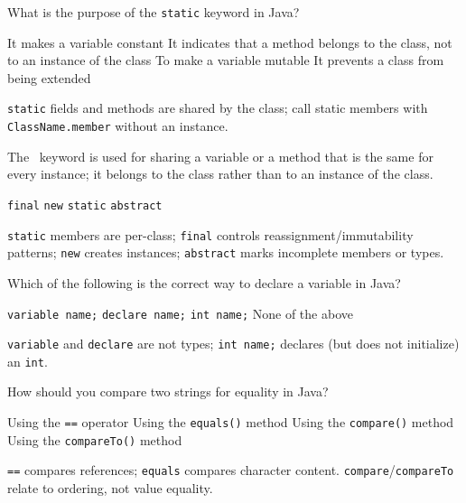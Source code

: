 \question[4]
What is the purpose of the \texttt{static} keyword in Java?
\begin{choices}
  \choice It makes a variable constant
  \CorrectChoice It indicates that a method belongs to the class, not to an instance of the class
  \choice To make a variable mutable
  \choice It prevents a class from being extended
\end{choices}
\begin{solution}
  \texttt{static} fields and methods are shared by the class; call static members with \texttt{ClassName.member} without an instance.
\end{solution}

\question[4]
The \blank[5em]\ keyword is used for sharing a variable or a method that is the same for every instance; it belongs to the class rather than to an instance of the class.
\begin{choices}
  \choice \lstinline!final!
  \choice \lstinline!new!
  \CorrectChoice \lstinline!static!
  \choice \lstinline!abstract!
\end{choices}
\begin{solution}
  \texttt{static} members are per-class; \texttt{final} controls reassignment/immutability patterns; \texttt{new} creates instances; \texttt{abstract} marks incomplete members or types.
\end{solution}

\question[4]
Which of the following is the correct way to declare a variable in Java?
\begin{choices}
  \choice \lstinline!variable name;!
  \choice \lstinline!declare name;!
  \CorrectChoice \lstinline!int name;!
  \choice None of the above
\end{choices}
\begin{solution}
  \texttt{variable} and \texttt{declare} are not types; \lstinline!int name;! declares (but does not initialize) an \texttt{int}.
\end{solution}

\question[4]
How should you compare two strings for equality in Java?
\begin{choices}
  \choice Using the \lstinline!==! operator
  \CorrectChoice Using the \lstinline!equals()! method
  \choice Using the \lstinline!compare()! method
  \choice Using the \lstinline!compareTo()! method
\end{choices}
\begin{solution}
  \texttt{==} compares references; \texttt{equals} compares character content. \texttt{compare}/\texttt{compareTo} relate to ordering, not value equality.
\end{solution}

